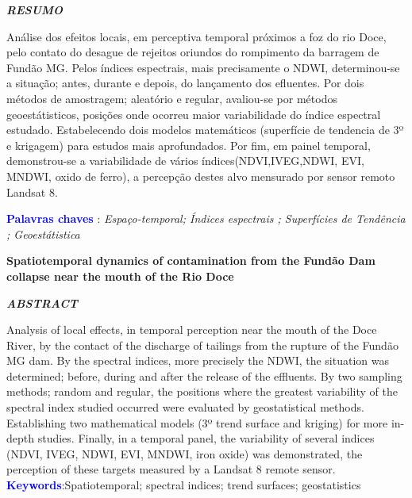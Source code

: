 \begin{center}
	\textbf{\textit{RESUMO}}
\end{center}
\noindent Análise dos efeitos locais, em perceptiva temporal  próximos a foz do rio Doce, pelo contato do desague de rejeitos oriundos do rompimento da barragem de Fundão MG. Pelos índices espectrais, mais precisamente o NDWI, determinou-se  a situação; antes, durante e depois, do lançamento dos efluentes. Por dois métodos de amostragem; aleatório e regular, avaliou-se por métodos geoestátisticos, posições onde ocorreu maior variabilidade do índice espectral estudado. Estabelecendo dois modelos matemáticos (superfície de tendencia de 3º e krigagem) para estudos mais aprofundados. Por fim, em painel temporal, demonstrou-se a variabilidade de vários índices(NDVI,IVEG,NDWI, EVI, MNDWI, oxido de ferro), a percepção destes alvo mensurado por sensor remoto Landsat 8. 

\noindent \textbf{\textcolor{blue}{Palavras chaves}  }:  \textit{ Espaço-temporal; Índices espectrais  ;  Superfícies de Tendência ; Geoestátistica }

\begin{center}
\textbf{Spatiotemporal dynamics of contamination from the Fundão Dam collapse near the mouth of the Rio Doce}
\end{center}
\begin{center}
	\textbf{\textit{ABSTRACT}}
\end{center}
\noindent  
\noindent  Analysis of local effects, in temporal perception near the mouth of the Doce River, by the contact of the discharge of tailings from the rupture of the Fundão MG dam. By the spectral indices, more precisely the NDWI, the situation was determined; before, during and after the release of the effluents. By two sampling methods; random and regular, the positions where the greatest variability of the spectral index studied occurred were evaluated by geostatistical methods. Establishing two mathematical models (3º trend surface and kriging) for more in-depth studies. Finally, in a temporal panel, the variability of several indices (NDVI, IVEG, NDWI, EVI, MNDWI, iron oxide) was demonstrated, the perception of these targets measured by a Landsat 8 remote sensor.
\noindent\textbf{\textcolor{blue}{ Keywords}}:Spatiotemporal; spectral indices; trend surfaces; geostatistics 

\begin{comment}
	\cite{Anderson}
	\cite{Anderson}\\
	\citep{Anderson}\\
	\citet{Anderson}\\
	\citealp{Anderson}, \\
	\citealt{Anderson}, \\
	\citeauthor{Anderson}, \\
	\citeyear{Anderson}, \\
	\citeyearpar{Anderson}, \\
	\citeauthor*{Anderson}, \\
	\citep*{Anderson}, \\
	\citet*{Tanimoto}
\end{comment}
 